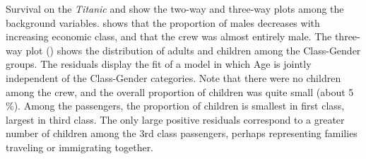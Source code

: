 \begin{Example}[titanic]{Survival on the \emph{Titanic}}
 and 
show the two-way and three-way plots among the background variables.
 shows that the proportion of males decreases
with increasing economic class, and that the crew was almost entirely male.
The three-way plot ()
shows the distribution of adults and children among the Class-Gender groups. The
residuals display the fit of a model in which Age is jointly independent of
the Class-Gender categories.
Note that there were no children among the crew, and the overall
proportion of children was quite small (about 5 \%).
Among the passengers, the proportion of children is smallest in
first class, largest in third class.
The only large positive residuals correspond to a greater number of children
among the 3rd class passengers, perhaps representing families traveling
or immigrating together.
%
\begin{figure}[htb]
 \begin{subfigmatrix}{2}
\end{subfigmatrix}
\end{figure}
\end{Example}
